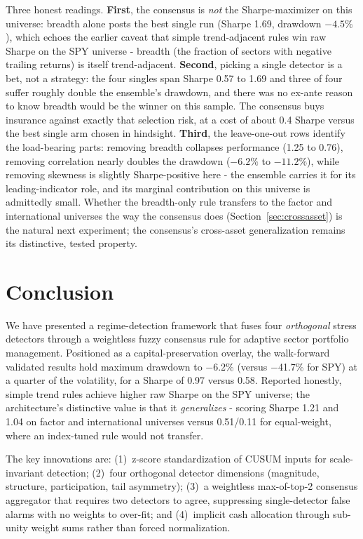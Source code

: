 \documentclass[11pt]{article}
\begin{document}
Three honest readings. \textbf{First}, the consensus is \emph{not} the
Sharpe-maximizer on this universe: breadth alone posts the best single
run (Sharpe 1.69, drawdown $-4.5\%$), which echoes the earlier caveat
that simple trend-adjacent rules win raw Sharpe on the SPY universe -
breadth (the fraction of sectors with negative trailing returns) is
itself trend-adjacent. \textbf{Second}, picking a single detector is a
bet, not a strategy: the four singles span Sharpe 0.57 to 1.69 and
three of four suffer roughly double the ensemble's drawdown, and there
was no ex-ante reason to know breadth would be the winner on this
sample. The consensus buys insurance against exactly that selection
risk, at a cost of about 0.4 Sharpe versus the best single arm chosen
in hindsight. \textbf{Third}, the leave-one-out rows identify the
load-bearing parts: removing breadth collapses performance (1.25 to
0.76), removing correlation nearly doubles the drawdown ($-6.2\%$ to
$-11.2\%$), while removing skewness is slightly Sharpe-positive here -
the ensemble carries it for its leading-indicator role, and its
marginal contribution on this universe is admittedly small. Whether the
breadth-only rule transfers to the factor and international universes
the way the consensus does (Section~\ref{sec:crossasset}) is the natural next
experiment; the consensus's cross-asset generalization remains its
distinctive, tested property.

\section{Conclusion}

We have presented a regime-detection framework that fuses four
\emph{orthogonal} stress detectors through a weightless fuzzy consensus
rule for adaptive sector portfolio management. Positioned as a
capital-preservation overlay, the walk-forward validated results hold
maximum drawdown to $-$6.2\% (versus $-$41.7\% for SPY) at a quarter of
the volatility, for a Sharpe of 0.97 versus 0.58. Reported honestly,
simple trend rules achieve higher raw Sharpe on the SPY universe; the
architecture's distinctive value is that it \emph{generalizes} - scoring
Sharpe 1.21 and 1.04 on factor and international universes versus
0.51/0.11 for equal-weight, where an index-tuned rule would not transfer.

The key innovations are: (1)~z-score standardization of CUSUM inputs for
scale-invariant detection; (2)~four orthogonal detector dimensions
(magnitude, structure, participation, tail asymmetry); (3)~a weightless
max-of-top-2 consensus aggregator that requires two detectors to agree,
suppressing single-detector false alarms with no weights to over-fit;
and (4)~implicit cash allocation through sub-unity weight sums rather
than forced normalization.
\end{document}
